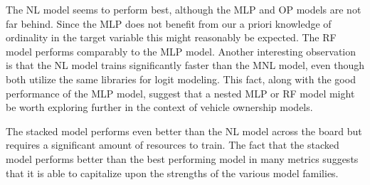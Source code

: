 \documentclass[numbered]{trbunofficial}
\begin{document}
The NL model seems to perform best, although the MLP and OP models are not far behind.
 Since the MLP does not benefit from our a priori knowledge of ordinality in the target variable this might reasonably be expected.
 The RF model performs comparably to the MLP model.
 Another interesting observation is that the NL model trains significantly faster than the MNL model, even though both utilize the same libraries for logit modeling.
 This fact, along with the good performance of the MLP model, suggest that a nested MLP or RF model might be worth exploring further in the context of vehicle ownership models.

The stacked model performs even better than the NL model across the board but requires a significant amount of resources to train.
 The fact that the stacked model performs better than the best performing model in many metrics suggests that it is able to capitalize upon the strengths of the various model families.
\end{document}
